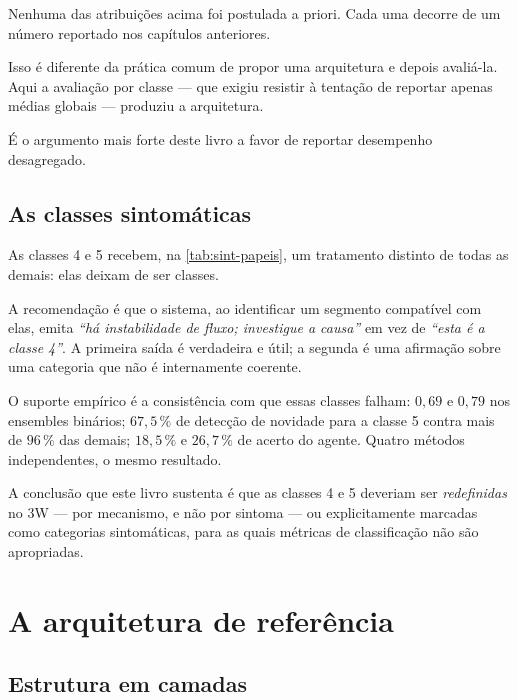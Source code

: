 \begin{destaque}
Nenhuma das atribuições acima foi postulada a priori. Cada uma decorre de um número
reportado nos capítulos anteriores.

Isso é diferente da prática comum de propor uma arquitetura e depois avaliá-la. Aqui a
avaliação por classe --- que exigiu resistir à tentação de reportar apenas médias
globais --- produziu a arquitetura.

É o argumento mais forte deste livro a favor de reportar desempenho desagregado.
\end{destaque}

\subsection{As classes sintomáticas}

As classes 4 e 5 recebem, na \cref{tab:sint-papeis}, um tratamento distinto de todas as
demais: elas deixam de ser classes.

A recomendação é que o sistema, ao identificar um segmento compatível com elas, emita
\emph{``há instabilidade de fluxo; investigue a causa''} em vez de \emph{``esta é a classe
4''}. A primeira saída é verdadeira e útil; a segunda é uma afirmação sobre uma categoria
que não é internamente coerente.

O suporte empírico é a consistência com que essas classes falham: $0{,}69$ e $0{,}79$ nos
ensembles binários; $67{,}5\,\%$ de detecção de novidade para a classe 5 contra mais de
$96\,\%$ das demais; $18{,}5\,\%$ e $26{,}7\,\%$ de acerto do agente. Quatro métodos
independentes, o mesmo resultado.

\begin{destaque}
A conclusão que este livro sustenta é que as classes 4 e 5 deveriam ser
\emph{redefinidas} no 3W --- por mecanismo, e não por sintoma --- ou explicitamente
marcadas como categorias sintomáticas, para as quais métricas de classificação não são
apropriadas.
\end{destaque}

\section{A arquitetura de referência}

\subsection{Estrutura em camadas}

